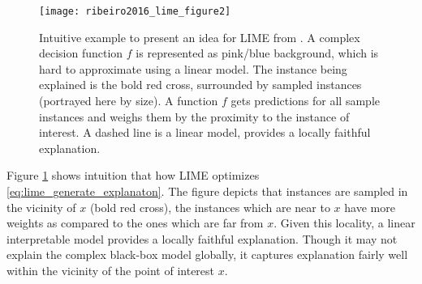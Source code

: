 \documentclass[english]{tktltiki2}
\theoremstyle{definition}
\theoremstyle{remark}
\begin{document}
\begin{figure}[H]
	\centering
	\vspace*{-2mm}
	\texttt{[image: ribeiro2016\_lime\_figure2]}
	\vspace*{-10mm}
	\caption{Intuitive example to present an idea for LIME from \citet{ribeiro2016should}. A complex decision function $f$ is represented as pink/blue background, which is hard to approximate using a linear model. The instance being explained is the bold red cross, surrounded by sampled instances (portrayed here by size). A function $f$ gets predictions for all sample instances and weighs them by the proximity to the instance of interest. A dashed line is a linear model, provides a locally faithful explanation. }
	\label{fig:ribeiro2016_lime_figure2}
\end{figure}

Figure \ref{fig:ribeiro2016_lime_figure2} shows intuition that how LIME \citep{ribeiro2016should} optimizes \eqref{eq:lime_generate_explanaton}. The figure depicts that instances are sampled in the vicinity of $x$ (bold red cross), the instances which are near to $x$ have more weights as compared to the ones which are far from $x$. Given this locality, a linear interpretable model provides a locally faithful explanation. Though it may not explain the complex black-box model globally, it captures explanation fairly well within the vicinity of the point of interest $x$. 



\end{document}
